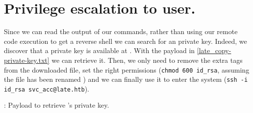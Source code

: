 \section{Privilege escalation to user.}
\par Since we can read the output of our commands, rather than using our remote code execution to get a reverse shell we can search for an  private key. Indeed, we discover that a private key is available at . With the payload in \ref{late_copy-private-key.txt} we can retrieve it. Then, we only need to remove the extra  tags from the downloaded file, set the right permissions (\texttt{chmod 600 id_rsa}, assuming the file has been renamed ) and we can finally use it to enter the system (\texttt{ssh -i id_rsa svc_acc@late.htb}).
\begin{listing}
  \footnotesize
	
	\caption{: Payload to retrieve 's  private key.}
	\label{late_copy-private-key.txt}
\end{listing}
